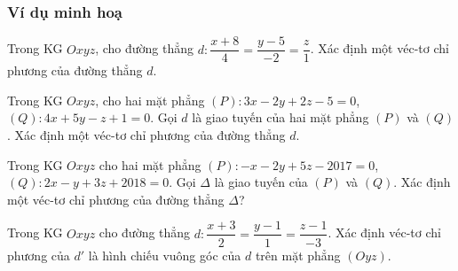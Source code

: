 	\subsubsection{Ví dụ minh hoạ}
	\begin{vd}%
	Trong KG $Oxyz$, cho đường thẳng $d:\dfrac{x+8}{4}=\dfrac{y-5}{-2}=\dfrac{z}{1}$. Xác định một véc-tơ chỉ phương của đường thẳng $d$.
	\end{vd}
	\begin{vd}%
	Trong KG $Oxyz$, cho hai mặt phẳng $(P): 3x-2y+2z-5=0$, $(Q): 4x+5y-z+1=0$. Gọi $ d $ là giao tuyến của hai mặt phẳng $(P)$ và $(Q)$. Xác định một véc-tơ chỉ phương của đường thẳng $d$.
	\end{vd}
	\begin{vd}%
	Trong KG $Oxyz$ cho hai mặt phẳng $(P)\colon -x-2y+5z-2017=0$, $(Q)\colon 2x-y+3z+2018=0$. Gọi $\Delta$ là giao tuyến của $(P)$ và $(Q)$. Xác định một véc-tơ chỉ phương của đường thẳng $\Delta$?
	\end{vd}
	\begin{vd}%
	Trong KG $Oxyz$ cho đường thẳng $d \colon \dfrac{x+3}{2} = \dfrac{y-1}{1}=\dfrac{z-1}{-3}$. Xác định véc-tơ chỉ phương của $ d' $ là hình chiếu vuông góc của $d$ trên mặt phẳng $(Oyz)$.
	\end{vd}
